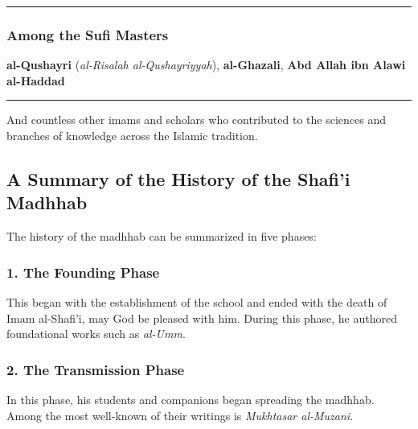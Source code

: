 \documentclass[
  a4paper,
  DIV=11,
  numbers=noendperiod]{scrartcl}
\begin{document}
\begin{center}\rule{0.5\linewidth}{0.5pt}\end{center}

\subsubsection{Among the Sufi Masters}\label{among-the-sufi-masters}

\textbf{al-Qushayri} (\emph{al-Risalah al-Qushayriyyah}),
\textbf{al-Ghazali}, \textbf{Abd Allah ibn Alawi al-Haddad}

\begin{center}\rule{0.5\linewidth}{0.5pt}\end{center}

And countless other imams and scholars who contributed to the sciences
and branches of knowledge across the Islamic tradition.

\subsection{A Summary of the History of the Shafi'i
Madhhab}\label{a-summary-of-the-history-of-the-shafii-madhhab}

The history of the madhhab can be summarized in five phases:

\subsubsection{1. The Founding Phase}\label{the-founding-phase}

This began with the establishment of the school and ended with the death
of Imam al-Shafi'i, may God be pleased with him. During this phase, he
authored foundational works such as \emph{al-Umm}.

\subsubsection{2. The Transmission Phase}\label{the-transmission-phase}

In this phase, his students and companions began spreading the madhhab.
Among the most well-known of their writings is \emph{Mukhtasar
al-Muzani}.
\end{document}
